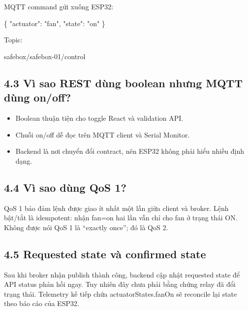 \documentclass[11pt,oneside,openany]{book}
\renewcommand{\texttt}[1]{{\ttfamily\small #1}}
\newenvironment{Shaded}{\begin{snugshade}}{\end{snugshade}}
\newcommand{\DataTypeTok}[1]{\textcolor[rgb]{0.16,0.50,0.73}{#1}}
\newcommand{\FunctionTok}[1]{\textcolor[rgb]{0.56,0.27,0.68}{#1}}
\newcommand{\NormalTok}[1]{\textcolor[rgb]{0.81,0.81,0.76}{#1}}
\newcommand{\StringTok}[1]{\textcolor[rgb]{0.96,0.31,0.31}{#1}}
\renewenvironment{Shaded}{%
  \def\FrameCommand{\fboxsep=8pt\colorbox{shadecolor}}%
  \MakeFramed{\advance\hsize-\width\FrameRestore}%
}{\endMakeFramed}
\providecommand{\tightlist}{\setlength{\itemsep}{1pt}\setlength{\parskip}{0pt}}
\begin{document}
MQTT command gửi xuống ESP32:

\begin{Shaded}
\begin{Highlighting}[]
\FunctionTok{\{}
  \DataTypeTok{"actuator"}\FunctionTok{:} \StringTok{"fan"}\FunctionTok{,}
  \DataTypeTok{"state"}\FunctionTok{:} \StringTok{"on"}
\FunctionTok{\}}
\end{Highlighting}
\end{Shaded}

Topic:

\begin{Shaded}
\begin{Highlighting}[]
\NormalTok{safebox/safebox{-}01/control}
\end{Highlighting}
\end{Shaded}

\subsection{4.3 Vì sao REST dùng boolean nhưng MQTT dùng
on/off?}\label{43-vuxec-sao-rest-duxf9ng-boolean-nhux1b0ng-mqtt-duxf9ng-onoff}

\begin{itemize}
\tightlist
\item
  Boolean thuận tiện cho toggle React và validation API.
\item
  Chuỗi \texttt{on}/\texttt{off} dễ đọc trên MQTT client và Serial
  Monitor.
\item
  Backend là nơi chuyển đổi contract, nên ESP32 không phải hiểu nhiều
  định dạng.
\end{itemize}

\subsection{4.4 Vì sao dùng QoS 1?}\label{44-vuxec-sao-duxf9ng-qos-1}

QoS 1 bảo đảm lệnh được giao ít nhất một lần giữa client và broker. Lệnh
bật/tắt là idempotent: nhận \texttt{fan=on} hai lần vẫn chỉ cho fan ở
trạng thái ON. Không được nói QoS 1 là ``exactly once''; đó là QoS 2.

\subsection{4.5 Requested state và confirmed
state}\label{45-requested-state-vuxe0-confirmed-state}

Sau khi broker nhận publish thành công, backend cập nhật requested state
để API status phản hồi ngay. Tuy nhiên đây chưa phải bằng chứng relay đã
đổi trạng thái. Telemetry kế tiếp chứa \texttt{actuatorStates.fanOn} sẽ
reconcile lại state theo báo cáo của ESP32.
\end{document}
